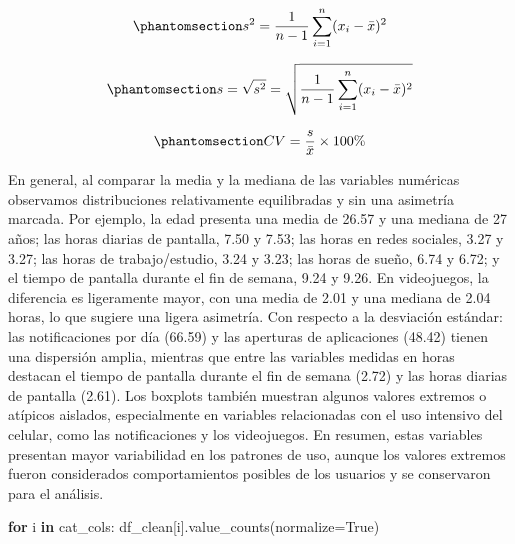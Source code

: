 \documentclass[11pt,spanish,a4paper,]{article}
\newenvironment{Shaded}{\begin{snugshade}}{\end{snugshade}}
\newcommand{\ControlFlowTok}[1]{\textcolor[rgb]{0.00,0.23,0.31}{\textbf{#1}}}
\newcommand{\KeywordTok}[1]{\textcolor[rgb]{0.00,0.23,0.31}{\textbf{#1}}}
\newcommand{\NormalTok}[1]{\textcolor[rgb]{0.00,0.23,0.31}{#1}}
\newcommand{\OperatorTok}[1]{\textcolor[rgb]{0.37,0.37,0.37}{#1}}
\newcommand{\VariableTok}[1]{\textcolor[rgb]{0.07,0.07,0.07}{#1}}
\begin{document}
\begin{equation}\protect\phantomsection\label{eq-varianza}{
s^2 = \frac{1}{n-1}\sum_{i=1}^{n} (x_i - \bar{x})^2
}\end{equation}

\begin{equation}\protect\phantomsection\label{eq-desviacion}{
s = \sqrt{s^2} = \sqrt{\frac{1}{n-1}\sum_{i=1}^{n} (x_i - \bar{x})^2}
}\end{equation}

\begin{equation}\protect\phantomsection\label{eq-cv}{
CV = \frac{s}{\bar{x}} \times 100\%
}\end{equation}

En general, al comparar la media y la mediana de las variables numéricas
observamos distribuciones relativamente equilibradas y sin una asimetría
marcada. Por ejemplo, la edad presenta una media de 26.57 y una mediana
de 27 años; las horas diarias de pantalla, 7.50 y 7.53; las horas en
redes sociales, 3.27 y 3.27; las horas de trabajo/estudio, 3.24 y 3.23;
las horas de sueño, 6.74 y 6.72; y el tiempo de pantalla durante el fin
de semana, 9.24 y 9.26. En videojuegos, la diferencia es ligeramente
mayor, con una media de 2.01 y una mediana de 2.04 horas, lo que sugiere
una ligera asimetría. Con respecto a la desviación estándar: las
notificaciones por día (66.59) y las aperturas de aplicaciones (48.42)
tienen una dispersión amplia, mientras que entre las variables medidas
en horas destacan el tiempo de pantalla durante el fin de semana (2.72)
y las horas diarias de pantalla (2.61). Los boxplots también muestran
algunos valores extremos o atípicos aislados, especialmente en variables
relacionadas con el uso intensivo del celular, como las notificaciones y
los videojuegos. En resumen, estas variables presentan mayor
variabilidad en los patrones de uso, aunque los valores extremos fueron
considerados comportamientos posibles de los usuarios y se conservaron
para el análisis.

\begin{Shaded}
\begin{Highlighting}[]
\ControlFlowTok{for}\NormalTok{ i }\KeywordTok{in}\NormalTok{ cat\_cols:}
\NormalTok{  df\_clean[i].value\_counts(normalize}\OperatorTok{=}\VariableTok{True}\NormalTok{)}
\end{Highlighting}
\end{Shaded}

\begin{table}

\caption{\label{tbl-proporcion-genero}Proporción de registros por
género.}


\end{table}%
\end{document}
